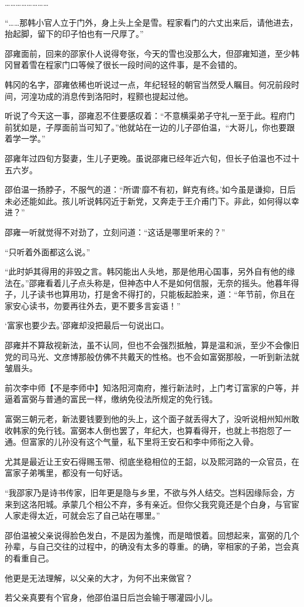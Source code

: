 ……………………

“……那韩小官人立于门外，身上头上全是雪。程家看门的六丈出来后，请他进去，抬起脚，留下的印子怕也有一尺厚了。”

邵雍面前，回来的邵家仆人说得夸张，今天的雪也没那么大，但邵雍知道，至少韩冈冒着雪在程家门口等候了很长一段时间的这件事，是不会错的。

韩冈的名字，邵雍依稀也听说过一点，年纪轻轻的朝官当然受人瞩目。何况前段时间，河湟功成的消息传到洛阳时，程颢也提起过他。

听说了今天这一事，邵雍忍不住要感叹着：“不意横渠弟子守礼一至于此。程府门前犹如是，子厚面前当可知了。”他就站在一边的儿子邵伯温，“大哥儿，你也要跟着学一学。”

邵雍年过四旬方娶妻，生儿子更晚。虽说邵雍已经年近六旬，但长子伯温也不过十五六岁。

邵伯温一扬脖子，不服气的道：“所谓‘靡不有初，鲜克有终。’如今虽是谦抑，日后未必还能如此。孩儿听说韩冈近于新党，又奔走于王介甫门下。非此，如何得以幸进？”

邵雍一听就觉得不对劲了，立刻问道：“这话是哪里听来的？”

“只听着外面都这么说。”

“此时妒其得用的非毁之言。韩冈能出人头地，那是他用心国事，另外自有他的缘法在。”邵雍看着儿子点头称是，但神态中人不是如何信服，无奈的摇头。他暮年得子，儿子读书也算用功，打是舍不得打的，只能板起脸来，道：“年节前，你且在家安心读书，勿要再往外去，更不要多言妄语！”

‘富家也要少去。’邵雍却没把最后一句说出口。

邵雍并不算敌视新法，虽不认同，但也不会强烈抵触，算是温和派，至少不会像旧党的司马光、文彦博那般仿佛不共戴天的性格。也不会如富弼那般，一听到新法就皱眉头。

前次李中师【不是李师中】知洛阳河南府，推行新法时，上门考订富家的户等，并逼着富弼与普通的富民一样，缴纳免役法所规定的免行钱。

富弼三朝元老，新法要钱要到他的头上，这个面子就丢得大了，没听说相州知州敢收韩家的免行钱。富弼本人倒也罢了，年纪大，也算看得开，也就上书抱怨了一通。但富家的儿孙没有这个气量，私下里将王安石和李中师衔之入骨。

尤其是最近让王安石得赐玉带、彻底坐稳相位的王韶，以及熙河路的一众官员，在富家子弟嘴里，都没有一句好话。

“我邵家乃是诗书传家，旧年更是隐与乡里，不欲与外人结交。岂料因缘际会，方来到这洛阳城。承蒙几个相公不弃，多有亲近。但你父我究竟还是个白身，与官宦人家走得太近，可就会忘了自己站在哪里。”

邵伯温被父亲说得脸色发白，不是因为羞愧，而是暗恨着。回想起来，富弼的几个孙辈，与自己交往的过程中，的确没有太多的尊重。的确，宰相家的子弟，岂会真的看重自己。

他更是无法理解，以父亲的大才，为何不出来做官？

若父亲真要有个官身，他邵伯温日后岂会输于哪灌园小儿。


